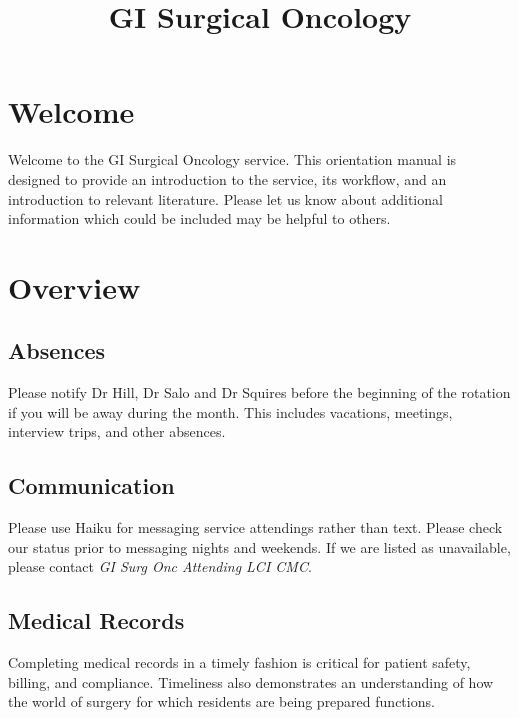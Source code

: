 \documentclass[
]{book}
\title{GI Surgical Oncology}
\author{}
\date{\vspace{-2.5em}}
\begin{document}
\maketitle

{
\setcounter{tocdepth}{0}
\tableofcontents
}
\hypertarget{welcome}{%
\chapter{Welcome}\label{welcome}}

Welcome to the GI Surgical Oncology service. This orientation manual is designed to provide an introduction to the service, its workflow, and an introduction to relevant literature. Please let us know about additional information which could be included may be helpful to others.

\hypertarget{Intro}{%
\chapter{Overview}\label{Intro}}

\hypertarget{absences}{%
\section{Absences}\label{absences}}

Please notify Dr Hill, Dr Salo and Dr Squires before the beginning of the rotation if you will be away during the month. This includes vacations, meetings, interview trips, and other absences.

\hypertarget{communication}{%
\section{Communication}\label{communication}}

Please use Haiku for messaging service attendings rather than text. Please check our status prior to messaging nights and weekends. If we are listed as unavailable, please contact \emph{GI Surg Onc Attending LCI CMC}.

\hypertarget{medical-records}{%
\section{Medical Records}\label{medical-records}}

Completing medical records in a timely fashion is critical for patient safety, billing, and compliance. Timeliness also demonstrates an understanding of how the world of surgery for which residents are being prepared functions.
\end{document}
